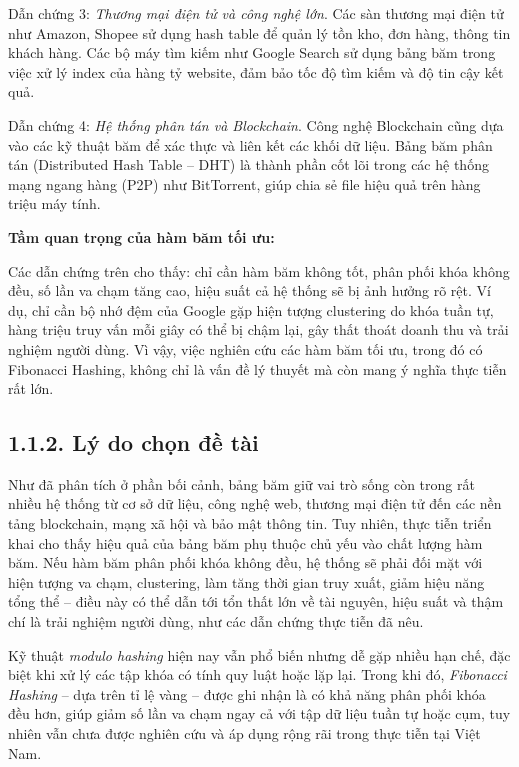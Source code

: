 \documentclass[12pt,a4paper]{report}
\begin{document}
Dẫn chứng 3: \textit{Thương mại điện tử và công nghệ lớn}.
Các sàn thương mại điện tử như Amazon, Shopee sử dụng hash table để quản lý tồn kho, đơn hàng, thông tin khách hàng. Các bộ máy tìm kiếm như Google Search sử dụng bảng băm trong việc xử lý index của hàng tỷ website, đảm bảo tốc độ tìm kiếm và độ tin cậy kết quả.

Dẫn chứng 4: \textit{Hệ thống phân tán và Blockchain}.
Công nghệ Blockchain cũng dựa vào các kỹ thuật băm để xác thực và liên kết các khối dữ liệu. Bảng băm phân tán (Distributed Hash Table – DHT) là thành phần cốt lõi trong các hệ thống mạng ngang hàng (P2P) như BitTorrent, giúp chia sẻ file hiệu quả trên hàng triệu máy tính.

\textbf{Tầm quan trọng của hàm băm tối ưu:}

Các dẫn chứng trên cho thấy: chỉ cần hàm băm không tốt, phân phối khóa không đều, số lần va chạm tăng cao, hiệu suất cả hệ thống sẽ bị ảnh hưởng rõ rệt. Ví dụ, chỉ cần bộ nhớ đệm của Google gặp hiện tượng clustering do khóa tuần tự, hàng triệu truy vấn mỗi giây có thể bị chậm lại, gây thất thoát doanh thu và trải nghiệm người dùng. Vì vậy, việc nghiên cứu các hàm băm tối ưu, trong đó có Fibonacci Hashing, không chỉ là vấn đề lý thuyết mà còn mang ý nghĩa thực tiễn rất lớn.

\subsection*{1.1.2. Lý do chọn đề tài}
\noindent \indent Như đã phân tích ở phần bối cảnh, bảng băm giữ vai trò sống còn trong rất nhiều hệ thống từ cơ sở dữ liệu, công nghệ web, thương mại điện tử đến các nền tảng blockchain, mạng xã hội và bảo mật thông tin. Tuy nhiên, thực tiễn triển khai cho thấy hiệu quả của bảng băm phụ thuộc chủ yếu vào chất lượng hàm băm. Nếu hàm băm phân phối khóa không đều, hệ thống sẽ phải đối mặt với hiện tượng va chạm, clustering, làm tăng thời gian truy xuất, giảm hiệu năng tổng thể – điều này có thể dẫn tới tổn thất lớn về tài nguyên, hiệu suất và thậm chí là trải nghiệm người dùng, như các dẫn chứng thực tiễn đã nêu.

Kỹ thuật \textit{modulo hashing} hiện nay vẫn phổ biến nhưng dễ gặp nhiều hạn chế, đặc biệt khi xử lý các tập khóa có tính quy luật hoặc lặp lại. Trong khi đó, \textit{Fibonacci Hashing }– dựa trên tỉ lệ vàng – được ghi nhận là có khả năng phân phối khóa đều hơn, giúp giảm số lần va chạm ngay cả với tập dữ liệu tuần tự hoặc cụm, tuy nhiên vẫn chưa được nghiên cứu và áp dụng rộng rãi trong thực tiễn tại Việt Nam.
\end{document}

